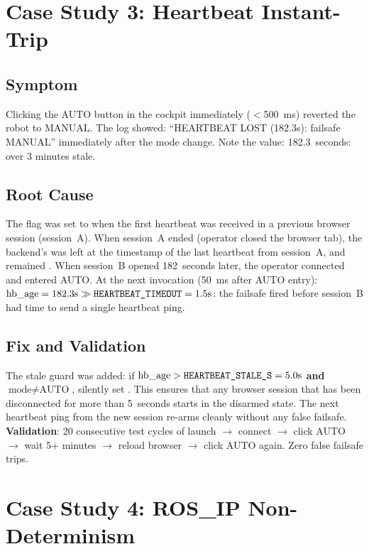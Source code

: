 \section{Case Study 3: Heartbeat Instant-Trip}

\subsection{Symptom}

Clicking the AUTO button in the cockpit immediately ($<$500~ms) reverted the robot to MANUAL. The log showed: ``HEARTBEAT LOST (182.3s): failsafe MANUAL'' immediately after the mode change. Note the  value: 182.3~seconds: over 3 minutes stale.

\subsection{Root Cause}

The  flag was set to  when the first heartbeat was received in a previous browser session (session~A). When session~A ended (operator closed the browser tab), the backend's  was left at the timestamp of the last heartbeat from session~A, and  remained . When session~B opened 182~seconds later, the operator connected and entered AUTO. At the next  invocation (50~ms after AUTO entry): $\text{hb\_age} = 182.3\text{s} \gg \code{HEARTBEAT\_TIMEOUT}=1.5\text{s}$: the failsafe fired before session~B had time to send a single heartbeat ping.

\subsection{Fix and Validation}

The stale guard was added: if $\text{hb\_age} > \code{HEARTBEAT\_STALE\_S}=5.0\text{s}$ \textbf{and} $\text{mode}\neq\text{AUTO}$, silently set . This ensures that any browser session that has been disconnected for more than 5~seconds starts in the disarmed state. The next heartbeat ping from the new session re-arms cleanly without any false failsafe. \textbf{Validation}: 20 consecutive test cycles of launch $\to$ connect $\to$ click AUTO $\to$ wait 5+ minutes $\to$ reload browser $\to$ click AUTO again. Zero false failsafe trips.

\section{Case Study 4: ROS\_IP Non-Determinism}

